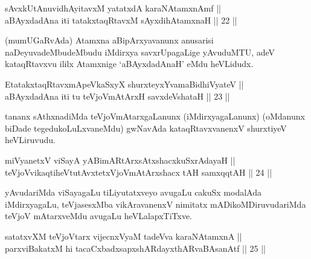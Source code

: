 
\begin{shl}
sAvxkUtAnuvidhAyitavxM yatatxdA karaNAtamxnAmf || \\
aBAyxdadAna iti tatakxtaqRtavxM sAyxdihA\s \s tamxnaH \hfill || 22 ||
  
\end{shl}

\begin{artha}
(mumUGaRvAda) Atamxna aBipArxyavanunx anusarisi naDeyuvadeMbudeMbudu
iMdirxya savxrUpagaLige yAvuduMTU, adeV kataqRtavxvu ililx Atamxnige
`aBAyxdadAnaH' eMdu heVLidudx.
\end{artha}

\begin{shl}
EtatakxtaqRtavxmApeVkaSxyX shurxteyxYvamaBidhiVyateV || \\
aBAyxdadAna iti tu teVjoVmAtArxH savxdeVshataH \hfill || 23 ||
  
\end{shl}

\begin{artha}
tananx sAthxnadiMda teVjoVmAtarxgaLanunx (iMdirxyagaLanunx) (oMdanunx
biDade tegedukoLuLxvaneMdu) gwNavAda kataqRtavxvanenxV shurxtiyeV
heVLiruvudu.
\end{artha}


\begin{shl}
miVyanetxV viSayA yABimARtArxsAtxshacxkuSxrAdayaH || \\
teVjoVvikaqtiheVtutAvxtetxVjoVmAtArxshacx tAH samxqqtAH \hfill || 24 ||
  
\end{shl}

\begin{artha}
yAvudariMda viSayagaLu tiLiyutatxveyo avugaLu cakuSx modalAda
iMdirxyagaLu, teVjasesxMba vikAravanenxV nimitatx mADikoMDiruvudariMda
teVjoV mAtarxveMdu avugaLu heVLalapxTiTxve.
\end{artha}


\begin{shl}
\footnotemark[1]satatxvXM teVjoV\s tarx vijecnxVyaM tadeVva karaNAtamxnA || \\
parxviBakatxM hi tacaCxbadxsapxshARdayxthARvaBAsanAtf \hfill || 25 ||
  
\end{shl}

